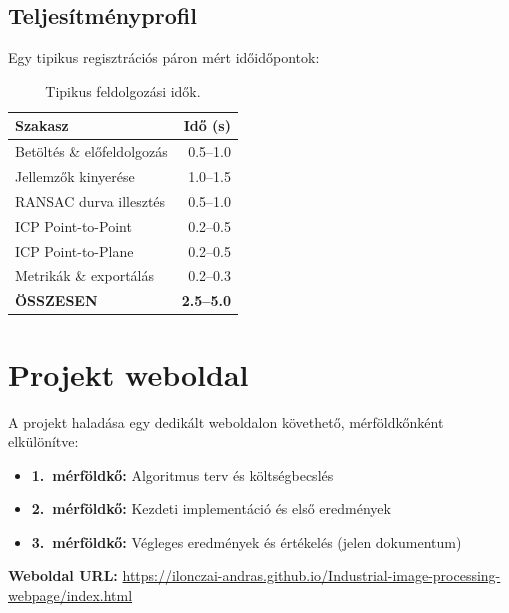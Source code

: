 \documentclass[12pt,a4paper]{article}
\begin{document}
\subsection{Teljesítményprofil}

Egy tipikus regisztrációs páron mért időidőpontok:

\begin{table}[H]
\centering
\begin{tabular}{lr}
\toprule
\textbf{Szakasz} & \textbf{Idő (s)} \\
\midrule
Betöltés \& előfeldolgozás & 0.5--1.0 \\
Jellemzők kinyerése & 1.0--1.5 \\
RANSAC durva illesztés & 0.5--1.0 \\
ICP Point-to-Point & 0.2--0.5 \\
ICP Point-to-Plane & 0.2--0.5 \\
Metrikák \& exportálás & 0.2--0.3 \\
\midrule
\textbf{ÖSSZESEN} & \textbf{2.5--5.0} \\
\bottomrule
\end{tabular}
\caption{Tipikus feldolgozási idők.}
\end{table}

\section{Projekt weboldal}

A projekt haladása egy dedikált weboldalon követhető, mérföldkőnként elkülönítve:

\begin{itemize}[nosep]
    \item \textbf{1.~mérföldkő:} Algoritmus terv és költségbecslés
    \item \textbf{2.~mérföldkő:} Kezdeti implementáció és első eredmények
    \item \textbf{3.~mérföldkő:} Végleges eredmények és értékelés (jelen dokumentum)
\end{itemize}

\textbf{Weboldal URL:} \url{https://ilonczai-andras.github.io/Industrial-image-processing-webpage/index.html}
\end{document}
